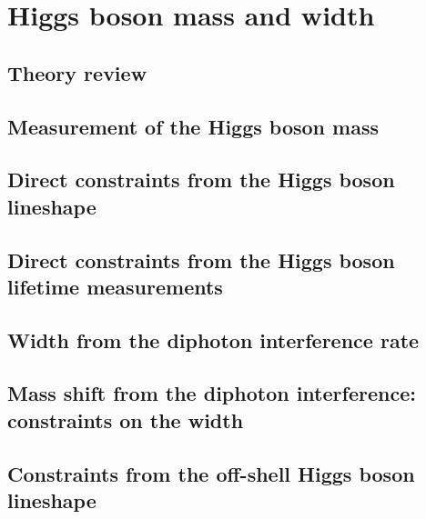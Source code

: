 \documentclass[../report.tex]{subfiles}
\providecommand{\main}{..}
\begin{document}
\section{Higgs boson mass and width}\label{sec5}

\subsection{Theory review}



\subsection{Measurement of the Higgs boson mass}

\subsection{Direct constraints from the Higgs boson lineshape}
\label{sec:5_mass}

\subsection{Direct constraints from the Higgs boson lifetime measurements}
\label{sec:5_lifetime}

\subsection{Width from the diphoton interference rate}
\label{sec:5_interference_real}

\subsection{Mass shift from the diphoton interference: constraints on the width}

\label{sec:5_interference_imag}

\subsection{Constraints from the off-shell Higgs boson lineshape}

\label{sec:5_offshell}

%
%
\end{document}
